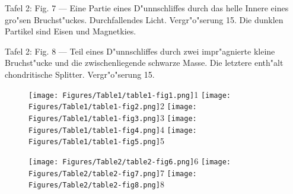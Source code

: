 \documentclass[a4paper, 11pt, oneside]{article}
\begin{document}
Tafel 2: Fig. 7 --- Eine Partie eines D"unnschliffes durch das helle Innere eines gro"sen Bruchst"uckes. Durchfallendes Licht. Vergr"o"serung 15. Die dunklen Partikel sind Eisen und Magnetkies.

Tafel 2: Fig. 8 --- Teil eines D"unnschliffes durch zwei impr"agnierte kleine Bruchst"ucke und die zwischenliegende schwarze Masse. Die letztere enth"alt chondritische Splitter. Vergr"o"serung 15.
\clearpage
\setlength\intextsep{0pt}
\pagestyle{fancy}
\fancyhf{}
\cfoot{\thepage}
\begin{figure}[p]
\texttt{[image: Figures/Table1/table1-fig1.png]}\tiny 1
\texttt{[image: Figures/Table1/table1-fig2.png]}\tiny 2
\texttt{[image: Figures/Table1/table1-fig3.png]}\tiny 3
\texttt{[image: Figures/Table1/table1-fig4.png]}\tiny 4
\texttt{[image: Figures/Table1/table1-fig5.png]}\tiny 5
\end{figure}
\clearpage
{}
\cfoot{\thepage}
\begin{figure}[p]
\texttt{[image: Figures/Table2/table2-fig6.png]}\tiny 6
\texttt{[image: Figures/Table2/table2-fig7.png]}\tiny 7
\texttt{[image: Figures/Table2/table2-fig8.png]}\tiny 8
\end{figure}
\clearpage
\end{document}
